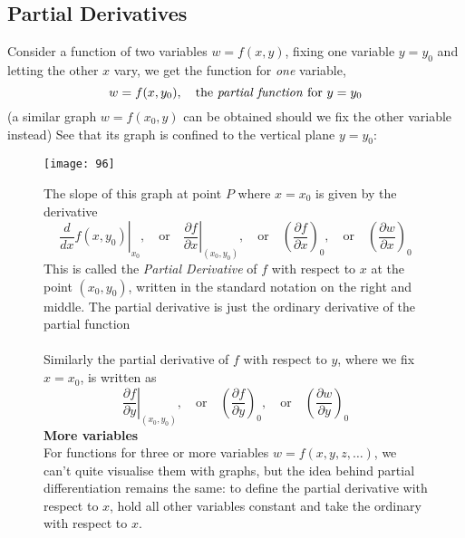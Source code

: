 \documentclass{report}
\begin{document}
\subsection{Partial Derivatives}%
Consider a function of two variables $w=f(x,y)$, fixing one variable 
$y=y_0$ and letting the other $x$ vary, we get the function for \textit{one} variable,
\begin{equation*}
w=f(x,y_0),\quad\text{the \textit{partial function} for }y=y_0
\end{equation*}
(a similar graph $w=f(x_0,y)$ can be obtained should we fix the other variable instead)
See that its graph is confined to the vertical plane $y=y_0$:
\begin{figure}[h]
\begin{center}
\texttt{[image: 96]}\\
\end{center}
The slope of this graph at point $P$ where $x=x_0$ is given by the derivative 
\begin{equation*}
\left.\frac{d}{dx}f(x,y_0)\right|_{x_0},\quad\text{or}
\quad\left.\frac{\partial f}{\partial x}\right|_{(x_0,y_0)},\quad\text{or}\quad
\left(\frac{\partial f}{\partial x}\right)_0,\quad\text{or}\quad
\left(\frac{\partial w}{\partial x}\right)_0
\end{equation*}
This is called the \textit{Partial Derivative} of $f$ with respect to $x$ at the point $(x_0,y_0)$, written 
in the standard notation on the right and middle. The partial derivative is just 
the ordinary derivative of the partial function\\
\vspace{1mm}\\
Similarly the partial derivative of $f$ with respect to $y$, where we fix $x=x_0$, is written as
\begin{equation*}
\left.\frac{\partial f}{\partial y}\right|_{(x_0,y_0)},\quad\text{or}\quad
\left(\frac{\partial f}{\partial y}\right)_0,\quad\text{or}\quad
\left(\frac{\partial w}{\partial y}\right)_0
\end{equation*}
\textbf{More variables}\\
For functions for three or more variables $w=f(x,y,z,\ldots)$, we can't quite visualise them with graphs, but 
the idea behind partial differentiation remains the same:
to define the partial derivative with respect to $x$, hold all other variables constant and take the 
ordinary with respect to $x$.
\end{figure}
\newpage
\end{document}
